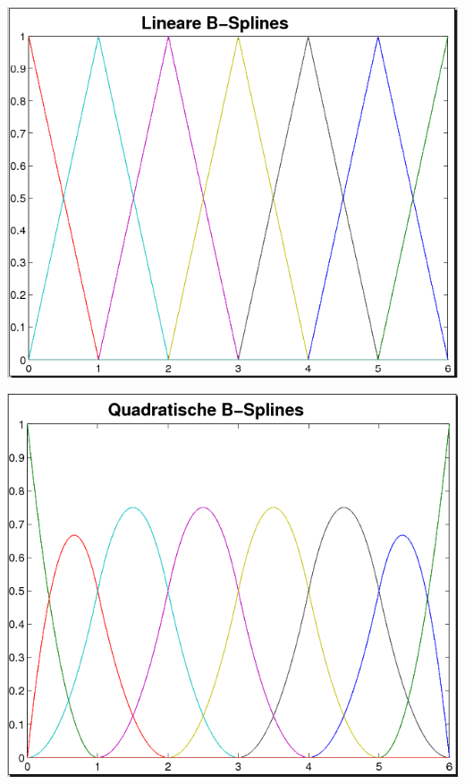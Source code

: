 {\centering
  \includegraphics[width=\linewidth]{images/linBsplines.png}

  \includegraphics[width=\linewidth]{images/quadBsplines.png}

}
